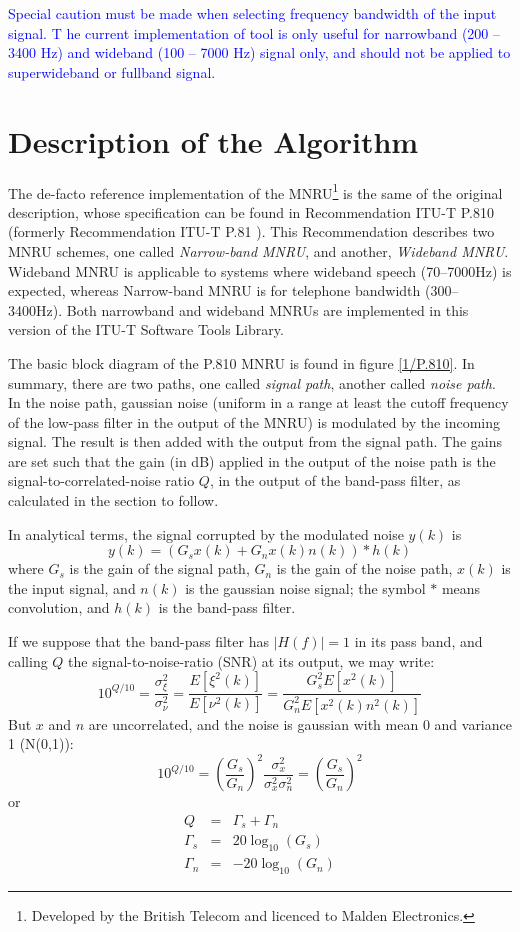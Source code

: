\textcolor{blue}{%
  Special caution must be made when selecting frequency bandwidth of the input signal. T
  he current implementation of tool is only useful for narrowband (200 -- 3400 Hz) and wideband (100 -- 7000 Hz) signal only, and should not be applied to superwideband or fullband signal.
%
}

\section{Description of the Algorithm}

The de-facto reference implementation of the MNRU\footnote{\SF
Developed by the British Telecom and licenced to Malden
Electronics.} is the same of the original description, whose
specification can be found in Recommendation ITU-T P.810
\cite{P.810} (formerly Recommendation ITU-T P.81 \cite{Old-P.81}).
This Recommendation describes two MNRU schemes, one called {\em
Narrow-band MNRU}, and another, {\em Wideband MNRU}. Wideband MNRU
is applicable to systems where wideband speech (70--7000Hz) is
expected, whereas Narrow-band MNRU is for telephone bandwidth
(300--3400Hz). Both narrowband and wideband MNRUs are implemented in
this version of the ITU-T Software Tools Library.

The basic block diagram of the P.810 MNRU is found in figure
\ref{1/P.810}. In summary, there are two paths, one called {\em signal
path}, another called {\em noise path}. In the noise path, gaussian
noise (uniform in a range at least the cutoff frequency of the
low-pass filter in the output of the MNRU) is modulated by the
incoming signal. The result is then added with the output from the
signal path. The gains are set such that the gain (in dB) applied in
the output of the noise path is the signal-to-correlated-noise ratio
$Q$, in the output of the band-pass filter, as calculated in the
section to follow.

In analytical terms, the signal corrupted by the modulated noise $y(k)$ is
\[
       y(k) = (G_s x(k) + G_n x(k) n(k)) \ast h(k)
\]
where $G_s$ is the gain of the signal path, $G_n$ is the gain of the
noise path, $x(k)$ is the input signal, and $n(k)$ is the gaussian
noise signal; the symbol $\ast$ means convolution, and $h(k)$ is the
band-pass filter.

If we suppose that the band-pass filter has $|H(f)|=1$ in its pass
band, and calling $Q$ the signal-to-noise-ratio (SNR) at its output,
we may write:
\[
    10^{Q/10} = \frac{\sigma^2_\xi}{\sigma^2_\nu} =
                \frac{E[\xi^2(k)]}{E[\nu^2(k)]}=
                \frac{G^2_s E[x^2(k)]}{G^2_n E[x^2(k) n^2(k)]}
\]
But $x$ and $n$ are uncorrelated, and the noise is gaussian with mean 0
and variance 1 (N(0,1)):
\[
    10^{Q/10} = \left( \frac{G_s}{G_n} \right)^2
                \frac{\sigma^2_x}{\sigma^2_x \sigma^2_n} =
                \left( \frac{G_s}{G_n} \right)^2
\]
or
\[
\begin{array}{lll}
     Q &= &\Gamma_s + \Gamma_n \\
     \Gamma_s &= &20 \log_{10}(G_s)\\
     \Gamma_n &= &-20 \log_{10}(G_n)
\end{array}
\]

